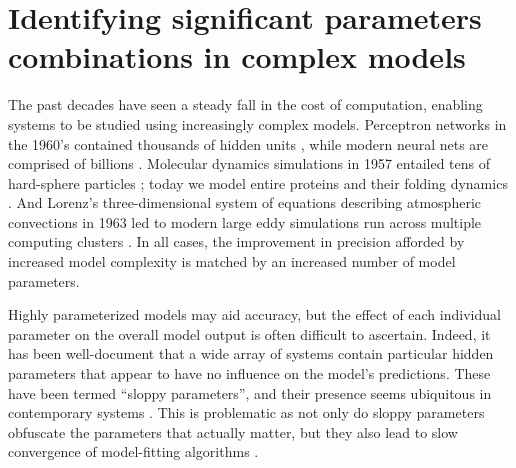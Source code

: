 \chapter{Identifying significant parameters combinations in complex
  models \label{ch:params}}




The past decades have seen a steady fall in the cost of computation,
enabling systems to be studied using increasingly complex models.
Perceptron networks in the 1960's contained thousands of hidden units
\cite{nagy_neural_1991}, while modern neural nets are
comprised of billions \cite{hsu_biggest_2015}. Molecular dynamics simulations in 1957 entailed tens of
hard-sphere particles \cite{alder_phase_1957}; today we model entire proteins and their folding dynamics
\cite{piana_atomic-level_2013}. And Lorenz's
three-dimensional system of equations describing atmospheric
convections in 1963 \cite{lorenz_deterministic_1963} led to
modern large eddy simulations run across multiple computing clusters
\cite{ghosal_dynamic_1995}. In all cases, the improvement in precision
afforded by increased model complexity is matched by an increased
number of model parameters.

Highly parameterized models may aid accuracy, but the effect of each
individual parameter on the overall model output is often difficult to
ascertain. Indeed, it has been well-document that a wide array of
systems contain particular hidden parameters that appear to have no
influence on the model's predictions. These have been termed ``sloppy
parameters'', and their presence seems ubiquitous in contemporary
systems \cite{gutenkunst_extracting_2007}. This is problematic as not only do sloppy parameters
obfuscate the parameters that actually matter, but they also lead to
slow convergence of model-fitting algorithms \cite{transtrum_geometry_2011}.

